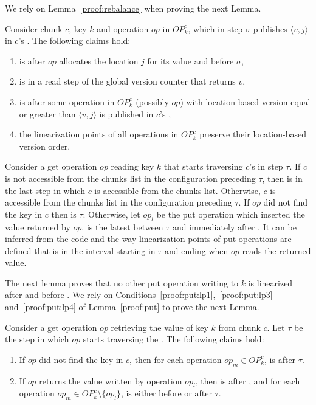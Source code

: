 We rely on Lemma~\ref{proof:rebalance} when proving the next Lemma.

\begin{lemma}
\label{proof:put}
Consider chunk $c$, key $k$ and operation $op$ in $OP_k^c$, which in step $\sigma$ publishes $\langle v, j\rangle$ in $c$'s . The following claims hold:
\begin{enumerate}
\setlength{\itemsep}{0pt}
\setlength{\parskip}{0pt}
\item \label{proof:put:lp1}  is after $op$ allocates the location $j$ for its value and before $\sigma$,
\item \label{proof:put:lp2}  is in a read step of the global version counter that returns $v$,
\item \label{proof:put:lp3}  is after some operation in $OP_k^c$ (possibly $op$) with location-based version equal or greater than $\langle v, j\rangle$ is published in $c$'s ,
\item \label{proof:put:lp4} the linearization points of all operations in $OP_k^c$ preserve their location-based version order.
\end{enumerate}
\end{lemma}


Consider a get operation $op$ reading key $k$ that starts traversing $c$'s  in step $\tau$. 
If $c$ is not accessible from the chunks list in the configuration preceding $\tau$, then  is in the last step in which $c$ is accessible from the chunks list.
Otherwise, $c$ is accessible from the chunks list in the configuration preceding $\tau$.
If $op$ did not find the key in $c$ then  is $\tau$. Otherwise, let $op_l$ be the put operation which inserted the value returned by $op$.  is the latest between $\tau$ and immediately after . It can be inferred from the code and the way linearization points of put operations are defined that  is in the interval starting in $\tau$ and ending when $op$ reads the returned value. 

The next lemma proves that no other put operation writing to $k$ is linearized after  and before .
We rely on Conditions~\ref{proof:put:lp1},~\ref{proof:put:lp3} and~\ref{proof:put:lp4} of Lemma~\ref{proof:put}
to prove the next Lemma.

\begin{lemma}
\label{proof:get}
Consider a get operation $op$ retrieving the value of key $k$ from chunk $c$. Let $\tau$ be the step in which $op$ starts traversing the . The following claims hold:
\begin{enumerate}
\setlength{\itemsep}{0pt}
\setlength{\parskip}{0pt}
\item \label{proof:get:lp1} If $op$ did not find the key in $c$, then for each operation $op_m \in OP_k^c$,  is after $\tau$.
\item \label{proof:get:lp2} If $op$ returns the value written by operation $op_l$, then  is after , and for each operation $op_m \in OP_k^c\setminus\{op_l\}$,  is either before  or after $\tau$.
\end{enumerate}
\end{lemma}


